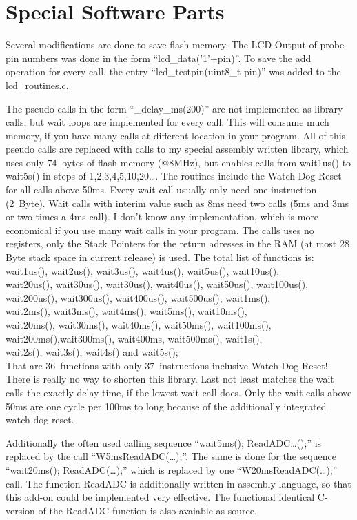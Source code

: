 
\chapter{Special Software Parts}

Several modifications are done to save flash memory.
The LCD-Output of probe-pin numbers was done in the form ``lcd\_data('1'+pin)''.
To save the add operation for every call, the entry ``lcd\_testpin(uint8\_t pin)''
was added to the lcd\_routines.c.


The pseudo calls in the form ``\_delay\_ms(200)'' are not implemented as library calls,
but wait loops are implemented for every call. This will consume much memory, if you
have many calls at different location in your program.
All of this pseudo calls are replaced with calls to my special assembly written library,
which uses only 74~bytes of flash memory (@8MHz), but enables calls from wait1us() to wait5s()
in steps of 1,2,3,4,5,10,20\dots . The routines  include the Watch Dog Reset for all calls
above 50ms. Every wait call usually only need one instruction (2~Byte). Wait calls
with interim value such as 8ms need two calls (5ms and 3ms or two times a 4ms call).
I don't know any implementation, which is more economical if you use many wait calls in your program.
The calls uses no registers, only the Stack Pointers for the return adresses
in the RAM (at most 28 Byte stack space in current release) is used.
The total list of functions is:\\
wait1us(), wait2us(), wait3us(), wait4us(), wait5us(), wait10us(), \\
wait20us(), wait30us(), wait30us(), wait40us(), wait50us(), wait100us(), \\
wait200us(), wait300us(), wait400us(), wait500us(), wait1ms(),\\
wait2ms(), wait3ms(), wait4ms(), wait5ms(), wait10ms(),\\
wait20ms(), wait30ms(), wait40ms(), wait50ms(), wait100ms(),\\
wait200ms(),wait300ms(), wait400ms, wait500ms(), wait1s(),\\
wait2s(), wait3s(), wait4s() and wait5s();\\
That are 36~functions with only 37~instructions inclusive Watch Dog Reset!
There is really no way to shorten this library.
Last not least matches the wait calls the exactly delay time, if the lowest wait call does.
Only the wait calls above 50ms are one cycle per 100ms to long because of the additionally integrated watch dog reset.


Additionally the often used calling sequence ``wait5ms(); ReadADC\dots();'' is replaced by the call
``W5msReadADC(\dots);''.
The same is done for the sequence ``wait20ms(); ReadADC(\dots);'' which is replaced by one 
``W20msReadADC(\dots);'' call.
The function ReadADC is additionally written in assembly language, so that this add-on could be
implemented very effective. The functional identical C-version of the ReadADC function is
also avaiable as source.
